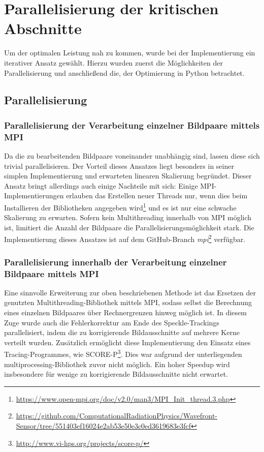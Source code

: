 \chapter{Parallelisierung der kritischen Abschnitte}

Um der optimalen Leistung nah zu kommen, wurde bei der Implementierung ein iterativer Ansatz gewählt. Hierzu wurden zuerst die Möglichkeiten der Parallelisierung und anschließend die, der Optimierung in Python betrachtet. 

\section{Parallelisierung}

\subsection{Parallelisierung der Verarbeitung einzelner Bildpaare mittels MPI}

Da die zu bearbeitenden Bildpaare voneinander unabhängig sind, lassen diese sich trivial parallelisieren. Der Vorteil dieses Ansatzes liegt besonders in seiner simplen Implementierung und erwarteten linearen Skalierung begründet. Dieser Ansatz bringt allerdings auch einige Nachteile mit sich: Einige \gls{MPI}-Implementierungen erlauben das Erstellen neuer Threads nur, wenn dies beim Installieren der Bibliotheken angegeben wird\footnote{\url{https://www.open-mpi.org/doc/v2.0/man3/MPI_Init_thread.3.php}} und es ist nur eine schwache Skalierung zu erwarten. Sofern kein Multithreading innerhalb von \gls{MPI} möglich ist, limitiert die Anzahl der Bildpaare die Parallelisierungsmöglichkeit stark. Die Implementierung dieses Ansatzes ist auf dem GitHub-Branch \textit{mpi}\footnote{\url{https://github.com/ComputationalRadiationPhysics/Wavefront-Sensor/tree/551403ef16024e2ab53e50e3c0ed3619683e3fcf}} verfügbar.

\subsection{Parallelisierung innerhalb der Verarbeitung einzelner Bildpaare mittels MPI}

Eine sinnvolle Erweiterung zur oben beschriebenen Methode ist das Ersetzen der genutzten Mul\-ti\-threa\-ding-Bibliothek mittels MPI, sodass selbst die Berechnung eines einzelnen Bildpaares über Rechnergrenzen hinweg möglich ist. In diesem Zuge wurde auch die Fehlerkorrektur am Ende des Speckle-Trackings parallelisiert, indem die zu korrigierende Bildausschnitte auf mehrere Kerne verteilt wurden. Zusätzlich ermöglicht diese Implementierung den Einsatz eines Tracing-Programmes, wie SCORE-P\footnote{\url{http://www.vi-hps.org/projects/score-p/}}. Dies war aufgrund der unterliegenden multiprocessing-Bibliothek zuvor nicht möglich. Ein hoher Speedup wird insbesondere für wenige zu korrigierende Bildausschnitte nicht erwartet. 

